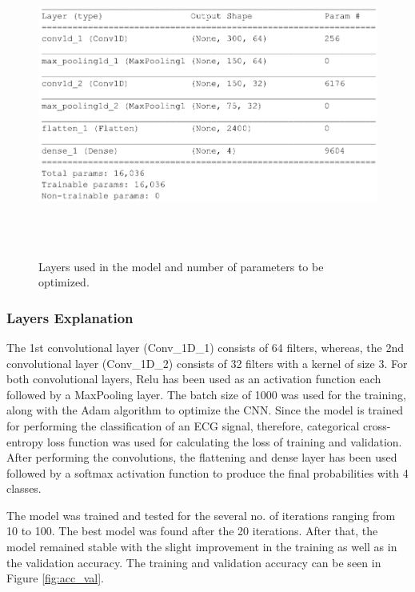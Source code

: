 \begin{figure}[htpb]
	\centering
	\includegraphics[width=12cm,height=10cm,keepaspectratio=true]{images/model_def_var}
	\caption{
		Layers used in the model and number of parameters to be optimized.
	}
	\label{fig:model_def_var}
\end{figure}

\subsubsection{Layers Explanation}
The 1st convolutional layer (Conv\_1D\_1) consists of 64 filters, whereas, the 2nd convolutional layer (Conv\_1D\_2) consists of 32 filters with a kernel of size 3. For both convolutional layers, Relu has been used as an activation function each followed by a MaxPooling layer. The batch size of 1000 was used for the training, along with the Adam algorithm to optimize the CNN. Since the model is trained for performing the classification of an ECG signal, therefore, categorical cross-entropy loss function was used for calculating the loss of training and validation. After performing the convolutions, the flattening and dense layer has been used followed by a softmax activation function to produce the final probabilities with 4 classes.


The model was trained and tested for the several no. of iterations ranging from 10 to 100. The best model was found after the 20 iterations. After that, the model remained stable with the slight improvement in the training as well as in the validation accuracy. The training and validation accuracy can be seen in Figure \ref{fig:acc_val}.


